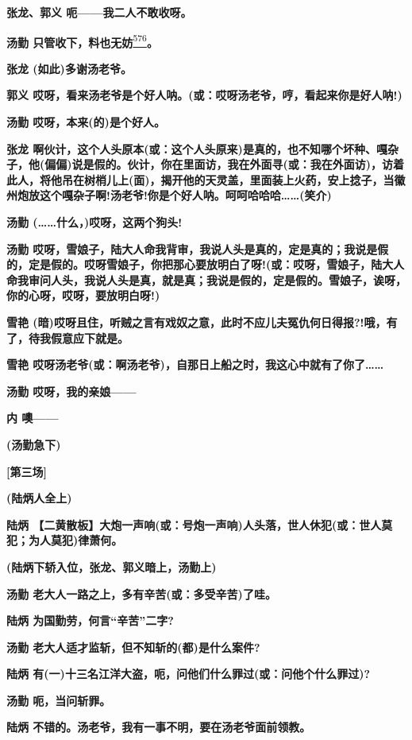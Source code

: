 \textbf{张龙、郭义 呃------我二人不敢收呀。}

\textbf{汤勤
只管收下，料也无妨}\protect\hyperlink{fn576}{\textsuperscript{576}}\textbf{。}

\textbf{张龙 (如此)多谢汤老爷。}

\textbf{郭义
哎呀，看来汤老爷是个好人呐。(或：哎呀汤老爷，哼，看起来你是好人呐!)}

\textbf{汤勤 哎呀，本来(的)是个好人。}

\textbf{张龙
啊伙计，这个人头原本(或：这个人头原来)是真的，也不知哪个坏种、嘎杂子，他(偏偏)说是假的。伙计，你在里面访，我在外面寻(或：我在外面访)，访着此人，将他吊在树梢儿上(面)，揭开他的天灵盖，里面装上火药，安上捻子，当徽州炮放这个嘎杂子啊!汤老爷!你是个好人呐。呵呵哈哈哈\ldots{}\ldots{}(笑介)}

\textbf{汤勤 (\ldots{}\ldots{}什么，)哎呀，这两个狗头!}

\textbf{汤勤
哎呀，雪娘子，陆大人命我背审，我说人头是真的，定是真的；我说是假的，定是假的。哎呀雪娘子，你把那心要放明白了呀!(或：哎呀，雪娘子，陆大人命我审问人头，我说人头是真，就是真；我说是假的，定是假的。雪娘子，诶呀，你的心呀，哎呀，要放明白呀!)}

\textbf{雪艳
(暗)哎呀且住，听贼之言有戏奴之意，此时不应儿夫冤仇何日得报?!哦，有了，待我假意应下就是。}

\textbf{雪艳
哎呀汤老爷(或：啊汤老爷)，自那日上船之时，我这心中就有了你了\ldots{}\ldots{}}

\textbf{汤勤 哎呀，我的亲娘------}

\textbf{内 噢------}

\textbf{(汤勤急下)}

\textbf{{[}第三场{]}}

\textbf{(陆炳人全上)}

\textbf{陆炳
【二黄散板】大炮一声响(或：号炮一声响)人头落，世人休犯(或：世人莫犯；为人莫犯)律萧何。}

\textbf{(陆炳下轿入位，张龙、郭义暗上，汤勤上)}

\textbf{汤勤 老大人一路之上，多有辛苦(或：多受辛苦)了哇。}

\textbf{陆炳 为国勤劳，何言``辛苦''二字?}

\textbf{汤勤 老大人适才监斩，但不知斩的(都)是什么案件?}

\textbf{陆炳
有(一)十三名江洋大盗，呃，问他们什么罪过(或：问他个什么罪过)?}

\textbf{汤勤 呃，当问斩罪。}

\textbf{陆炳 不错的。汤老爷，我有一事不明，要在汤老爷面前领教。}

